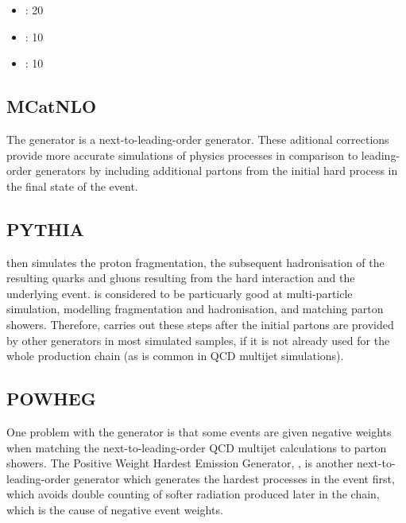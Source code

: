 \onehalfspacing
\begin{itemize}
  \item \ttbar: 20\GeV
  \item \WpJets: 10\GeV
  \item \ZpJets: 10\GeV
\end{itemize}
\doublespacing

\subsection{MCatNLO}
\label{ss:mcatnlo}
The \MCATNLO \cite{mcatnlo_Frixione1, mcatnlo_Frixione2} generator is a next-to-leading-order generator. These
aditional corrections provide more accurate simulations of physics processes in comparison to leading-order
generators by including additional partons from the initial hard process in the final state of the event.

\subsection{PYTHIA}
\label{ss:pythia}
\PYTHIA \cite{pythia8} then simulates the proton fragmentation, the subsequent hadronisation of the
resulting quarks and gluons resulting from the hard interaction and the underlying event. \PYTHIA is
considered to be particuarly good at multi-particle simulation, modelling fragmentation and hadronisation, and
matching parton showers. Therefore, \PYTHIA carries out these steps after the initial partons are provided
by other generators in most simulated samples, if it is not already used for the whole production chain (as is
common in QCD multijet simulations).

\subsection{POWHEG}
\label{ss:powheg}
One problem with the \MCATNLO generator is that some events are given negative weights when matching
the next-to-leading-order QCD multijet calculations to parton showers.  The Positive Weight Hardest Emission
Generator, \POWHEG \cite{powheg_Frixione, powheg_Nason, powheg_Alioli}, is another next-to-leading-order
generator which generates the hardest processes in the event first, which avoids double counting of
softer radiation produced later in the chain, which is the cause of negative event weights.


